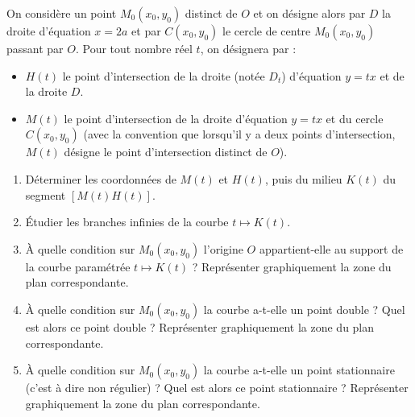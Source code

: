 On consid{\`e}re un point $M_{0} (x_{0}, y_{0})$ distinct de $O$ et
on d{\'e}signe alors par $D$ la droite d'{\'e}quation $x = 2a$ et
par $C (x_{0}, y_{0})$ le cercle de centre $M_{0} (x_{0}, y_{0})$
passant par $O$.\newline
Pour tout nombre r{\'e}el $t$, on d{\'e}signera par :
\begin{itemize}
\item $H(t)$ le point d'intersection de la droite (notée $D_t$) d'{\'e}quation $y = tx$ et de la droite $D$.
\item $M(t)$ le point d'intersection de la droite d'{\'e}quation $y = tx$ et du cercle $C (x_{0}, y_{0})$ (avec la convention que lorsqu'il y a deux points d'intersection, $M(t)$ d{\'e}signe le point d'intersection distinct de $O$).
\end{itemize}
\begin{enumerate}
\item D{\'e}terminer les coordonn{\'e}es de $M(t)$ et $H(t)$, puis du milieu $K(t)$ du segment $[M(t)H(t)]$.
\item \'Etudier les branches infinies de la courbe $t \mapsto K(t)$.
\item \`A quelle condition sur $M_{0} (x_{0}, y_{0})$ l'origine $O$ appartient-elle au support de la courbe paramétrée $t \mapsto K(t)$ ?\newline
Repr{\'e}senter graphiquement la zone du plan correspondante.

\item \`A quelle condition sur $M_{0} (x_{0}, y_{0})$ la courbe a-t-elle un point double ? \newline
Quel est alors ce point double ? Repr{\'e}senter graphiquement la
zone du plan correspondante.

\item \`A quelle condition sur $M_{0} (x_{0}, y_{0})$ la courbe a-t-elle un point stationnaire (c'est {\`a} dire non r{\'e}gulier) ?\newline
Quel est alors ce point stationnaire ? Repr{\'e}senter graphiquement la zone du plan correspondante.
\end{enumerate}
